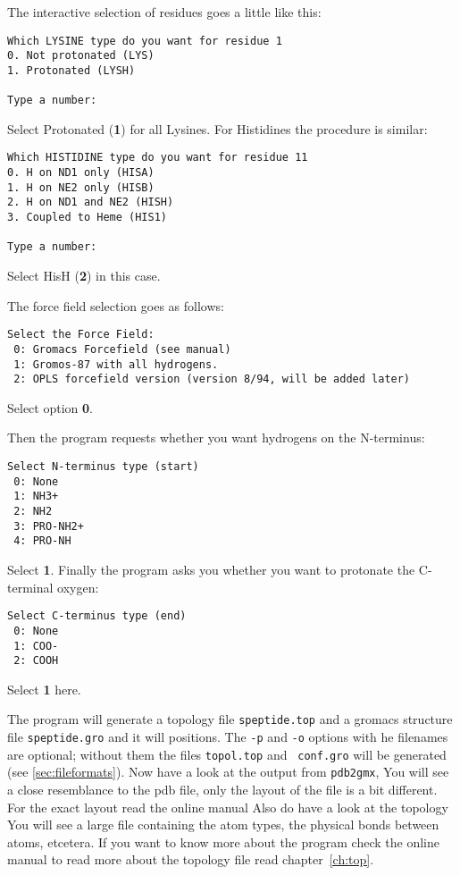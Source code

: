 The interactive selection of residues goes a little like this:

\begin{verbatim}
Which LYSINE type do you want for residue 1
0. Not protonated (LYS)
1. Protonated (LYSH)

Type a number:
\end{verbatim}

Select Protonated ({\bf 1}) for all Lysines. For Histidines the
procedure is similar: 
\begin{verbatim}
Which HISTIDINE type do you want for residue 11
0. H on ND1 only (HISA)
1. H on NE2 only (HISB)
2. H on ND1 and NE2 (HISH)
3. Coupled to Heme (HIS1)

Type a number:
\end{verbatim} 
Select HisH ({\bf 2}) in this case.

The force field selection goes as follows: 
\begin{verbatim}
Select the Force Field:
 0: Gromacs Forcefield (see manual)
 1: Gromos-87 with all hydrogens.
 2: OPLS forcefield version (version 8/94, will be added later) 
\end{verbatim}

Select option {\bf 0}.
	
Then the program requests whether you want hydrogens on the N-terminus:
\begin{verbatim}
Select N-terminus type (start)
 0: None
 1: NH3+
 2: NH2
 3: PRO-NH2+
 4: PRO-NH
\end{verbatim}

Select {\bf 1}. Finally the program asks you whether you want
to protonate the C-terminal oxygen:
\begin{verbatim}
Select C-terminus type (end)
 0: None
 1: COO-
 2: COOH
\end{verbatim}

Select {\bf 1} here.

The program will generate a topology file {\tt speptide.top} and a
{gromacs} structure file {\tt speptide.gro} and it will 
positions. The {\tt -p} and {\tt -o} options with he
filenames are optional; without them the files {\tt topol.top} and {\tt
conf.gro} will be generated (see \ref{sec:fileformats}).  Now have a
look at the output from {\tt pdb2gmx},
You will see a close resemblance to the pdb file, only the layout of
the file is a bit different. For the exact layout read the online
manual 
Also do have a look at the topology 
You will see a large file containing the atom types, the physical
bonds between atoms, etcetera. If you want to know more about the
program check the online manual 
to read more about the topology file read chapter~\ref{ch:top}.

